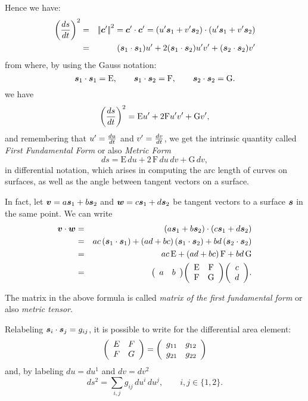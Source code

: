 \documentclass{31x47jw}
\begin{document}
Hence we have:
\begin{eqnarray*}
\left({ds \over dt}\right)^{2} &=& \module{\p{c}'}^{2} %
 = \p{c}'\cdot\p{c}'%
= (u' \p{s}_{1} + v' \p{s}_{2}) \cdot (u' \p{s}_{1} + v' \p{s}_{2}) \\
 &=& (\p{s}_{1}\cdot\p{s}_{1}) u' + 2 (\p{s}_{1}\cdot\p{s}_{2}) u' v'
      + (\p{s}_{2}\cdot\p{s}_{2}) v' 
\end{eqnarray*}
from where, by using the Gauss  notation:
\begin{equation}
{\mbox{\boldmath $s$}}_{1}\cdot{\mbox{\boldmath $s$}}_{1} = \mbox{E}, \qquad
{\mbox{\boldmath $s$}}_{1}\cdot{\mbox{\boldmath $s$}}_{2} = \mbox{F}, \qquad
{\mbox{\boldmath $s$}}_{2}\cdot{\mbox{\boldmath $s$}}_{2} = \mbox{G} .
\label{eq:5:firstform}
\end{equation}
we have
\[  
\left({ds \over dt}\right)^{2}
= \mbox{E} u' + 2 \mbox{F} u' v' + \mbox{G} v',
\]
and remembering that $u' = {du \over dt}$ and  $v' = {dv \over dt}$, we get 
the intrinsic quantity called \emph{First Fundamental Form} or also 
\emph{Metric Form}
\[
ds = \mbox{E}\, du + 2\, \mbox{F}\, du\, dv + \mbox{G}\, dv,
\]
in differential notation, which arises in computing the arc length of
curves on surfaces, as well as the angle between tangent vectors on a
surface.

In fact, let ${\mbox{\boldmath $v$}} = a {\mbox{\boldmath $s$}}_{1} + b {\mbox{\boldmath $s$}}_{2}$ and ${\mbox{\boldmath $w$}} = c
{\mbox{\boldmath $s$}}_{1} + d {\mbox{\boldmath $s$}}_{2}$ be tangent vectors to a surface ${\mbox{\boldmath $s$}}$
in the same point. We can write
\begin{eqnarray*}
{\mbox{\boldmath $v$}} \cdot {\mbox{\boldmath $w$}} &=& (a {\mbox{\boldmath $s$}}_{1} + b {\mbox{\boldmath $s$}}_{2}) \cdot (c {\mbox{\boldmath $s$}}_{1} +
d {\mbox{\boldmath $s$}}_{2})\\
&=& ac\, ({\mbox{\boldmath $s$}}_{1}\cdot{\mbox{\boldmath $s$}}_{1}) + (ad + bc)\, ({\mbox{\boldmath $s$}}_{1}\cdot{\mbox{\boldmath $s$}}_{2}) +
bd\, ({\mbox{\boldmath $s$}}_{2}\cdot{\mbox{\boldmath $s$}}_{2})\\
&=& ac\, \mbox{E} + (ad + bc)\, \mbox{F} + bd\, \mbox{G}\\
&=& {\left(\begin{array}{cccccccc}a & b\end{array}\right)}{\left(\begin{array}{cccccccc} \mbox{E} &  \mbox{F} \\ \mbox{F} &  
\mbox{G}\end{array}\right)}{\left(\begin{array}{cccccccc}c \\ d\end{array}\right)}.
\end{eqnarray*}

The matrix in the above formula is called \emph{matrix of the first
fundamental form} or also \emph{metric tensor}. 

Relabeling ${\mbox{\boldmath $s$}}_{i}\cdot{\mbox{\boldmath $s$}}_{j} = g_{ij}$, it is possible to write 
for the differential area element:    
\[
{\left(\begin{array}{cccccccc} E & F \\ F & G \end{array}\right)} = 
{\left(\begin{array}{cccccccc} g_{11} & g_{12} \\ g_{21} & g_{22} \end{array}\right)} 
\]
and, by labeling $du = du^{1}$ and $dv = dv^{2}$
\[
ds^{2} = \sum_{i,j} g_{ij}\, du^{i}\, du^{j}, \qquad i,j\in \{1,2\}.
\]
\end{document}
